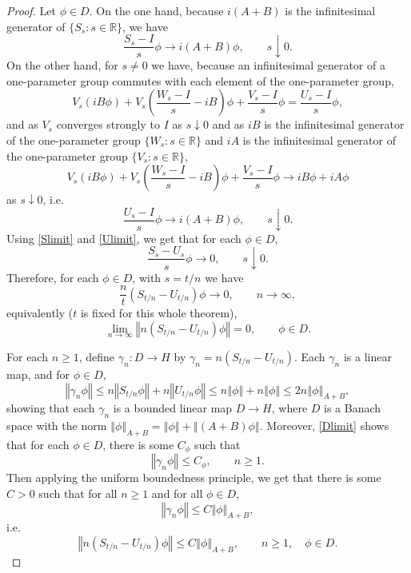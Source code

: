 \documentclass{article}
\newcommand{\norm}[1]{\left\Vert #1 \right\Vert}
\theoremstyle{definition}
\begin{document}
\begin{proof}
Let $\phi \in D$. On the one hand, because $i(A+B)$ is the infinitesimal generator of $\{S_s: s \in \mathbb{R}\}$, we have
\begin{equation}
\frac{S_s-I}{s} \phi \to i(A+B)\phi, \qquad s \downarrow 0.
\label{Slimit}
\end{equation}
On the other hand, for $s \neq 0$ we have, because an infinitesimal generator of a one-parameter group 
commutes with each element of the one-parameter group,
\[
V_s (iB\phi) + V_s \left(\frac{W_s-I}{s}-iB\right)\phi
+\frac{V_s-I}{s}\phi
=\frac{U_s-I}{s}\phi,
\]
and as $V_s$ converges strongly to $I$ as $s \downarrow 0$ and as $iB$ is the infinitesimal generator of
the one-parameter group $\{W_s: s \in \mathbb{R}\}$ and
$iA$ is the infinitesimal generator of the one-parameter group $\{V_s: s \in \mathbb{R}\}$,
\[
V_s (iB\phi) + V_s \left(\frac{W_s-I}{s}-iB\right)\phi
+\frac{V_s-I}{s}\phi \to
iB\phi+iA\phi
\]
as $s \downarrow 0$, i.e.
\begin{equation}
\frac{U_s-I}{s}\phi \to i(A+B)\phi, \qquad s \downarrow 0.
\label{Ulimit}
\end{equation}
Using \eqref{Slimit} and \eqref{Ulimit}, we get that for each $\phi \in D$, 
\[
\frac{S_s-U_s}{s} \phi \to 0, \qquad s \downarrow 0.
\]
Therefore, for each $\phi \in D$, with $s=t/n$ we have
\[
\frac{n}{t}(S_{t/n}-U_{t/n})\phi \to 0, \qquad n \to \infty,
\]
equivalently ($t$ is fixed for this whole theorem),
\begin{equation}
\lim_{n \to \infty}  \norm{n(S_{t/n}-U_{t/n})\phi}=0, \qquad \phi \in D.
\label{Dlimit}
\end{equation}

For each $n \geq 1$, define $\gamma_n:D \to H$ by $\gamma_n = n(S_{t/n}-U_{t/n})$. Each $\gamma_n$ is a linear map, 
and for $\phi \in D$,
\[
\norm{\gamma_n \phi} 
\leq n\norm{S_{t/n}\phi}+n\norm{U_{t/n}\phi}
\leq n\norm{\phi}+n\norm{\phi}
\leq 2n\norm{\phi}_{A+B},
\]
showing that each $\gamma_n$ is a bounded linear map $D \to H$, where $D$ is a Banach space
with the norm $\norm{\phi}_{A+B} = \norm{\phi}+\norm{(A+B)\phi}$. 
Moreover, 
\eqref{Dlimit} shows that for each $\phi \in D$,
there is some $C_\phi$ such that
\[
\norm{\gamma_n \phi} \leq C_\phi, \qquad n \geq 1.
\]
Then applying the uniform boundedness principle, we get that there is some $C>0$ such that for all $n \geq 1$ and for all $\phi \in D$,
\[
\norm{\gamma_n \phi} \leq C \norm{\phi}_{A+B},
\]
i.e. 
\begin{equation}
\norm{n(S_{t/n}-U_{t/n})\phi} \leq C \norm{\phi}_{A+B}, \qquad n \geq 1, \quad \phi \in D.
\label{steinhaus}
\end{equation}


\end{proof}
\end{document}
